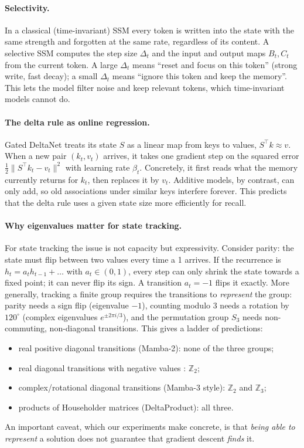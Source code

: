 \paragraph{Selectivity.} In a classical (time-invariant) SSM every token is written into the state with the
same strength and forgotten at the same rate, regardless of its content. A selective SSM computes the step
size $\Delta_t$ and the input and output maps $B_t, C_t$ from the current token. A large $\Delta_t$ means
``reset and focus on this token'' (strong write, fast decay); a small $\Delta_t$ means ``ignore this token
and keep the memory''. This lets the model filter noise and keep relevant tokens, which time-invariant
models cannot do.

\paragraph{The delta rule as online regression.} Gated DeltaNet treats its state $S$ as a linear map from
keys to values, $S^\top k\approx v$. When a new pair $(k_t, v_t)$ arrives, it takes one gradient step on the
squared error $\tfrac12\lVert S^\top k_t - v_t\rVert^2$ with learning rate $\beta_t$. Concretely, it first
reads what the memory currently returns for $k_t$, then replaces it by $v_t$. Additive models, by contrast,
can only add, so old associations under similar keys interfere forever. This predicts that the delta rule
uses a given state size more efficiently for recall.

\paragraph{Why eigenvalues matter for state tracking.} For state tracking the issue is not capacity but
expressivity. Consider parity: the state must flip between two values every time a 1 arrives. If the
recurrence is $h_t = a_t h_{t-1} + \dots$ with $a_t\in(0,1)$, every step can only shrink the state towards a
fixed point; it can never flip its sign. A transition $a_t=-1$ flips it exactly. More generally, tracking a
finite group requires the transitions to \emph{represent} the group: parity needs a sign flip (eigenvalue
$-1$), counting modulo 3 needs a rotation by $120^\circ$ (complex eigenvalues $e^{\pm 2\pi i/3}$), and the
permutation group $S_3$ needs non-commuting, non-diagonal transitions. This gives a ladder of predictions:
\begin{itemize}
  \item real positive diagonal transitions (Mamba-2): none of the three groups;
  \item real diagonal transitions with negative values \citep{grazzi2025unlocking}: $\mathbb{Z}_2$;
  \item complex/rotational diagonal transitions (Mamba-3 style): $\mathbb{Z}_2$ and $\mathbb{Z}_3$;
  \item products of Householder matrices (DeltaProduct): all three.
\end{itemize}
An important caveat, which our experiments make concrete, is that \emph{being able to represent} a solution
does not guarantee that gradient descent \emph{finds} it.

